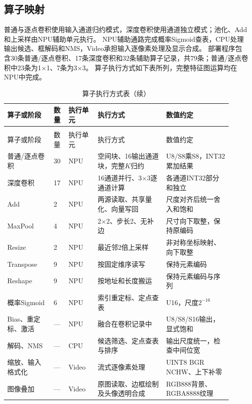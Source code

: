 \subsection{算子映射}

普通与逐点卷积使用输入通道归约模式，深度卷积使用通道独立模式；池化、Add和上采样由NPU辅助单元执行。
NPU辅助通路完成概率Sigmoid查表，CPU处理输出候选、框解码和NMS，Video承担输入逐像素处理及显示合成。
部署程序包含30条普通/逐点卷积、17条深度卷积和32条辅助算子记录，共79条；普通/逐点卷积中23条为1$\times$1、7条为3$\times$3。
算子执行方式如下表所列，完整特征图运算均在NPU中完成。

\begin{reporttable}
\setlength{\tabcolsep}{3pt}
\begin{longtable}{@{}p{0.19\linewidth}p{0.06\linewidth}p{0.12\linewidth}p{0.28\linewidth}p{0.27\linewidth}@{}}
\caption{算子执行方式表}\\
\toprule
算子或阶段 & 数量 & 执行单元 & 执行方式 & 数值约定 \\
\midrule
\endfirsthead
\caption[]{算子执行方式表（续）}\\
\toprule
算子或阶段 & 数量 & 执行单元 & 执行方式 & 数值约定 \\
\midrule
\endhead
\bottomrule
\endfoot
普通/逐点卷积 & 30 & NPU & 空间块、16输出通道块，完整$K$归约 & U8/S8乘S8，INT32累加结果 \\
深度卷积 & 17 & NPU & 16通道并行、3$\times$3逐通道计算 & 各通道INT32部分和独立 \\
Add & 2 & NPU & 两源读取、共享量化、向量写回 & 尺度对齐后统一舍入和饱和 \\
MaxPool & 4 & NPU & 2$\times$2、步长2、无补边 & 尺寸向下取整，保持原编码 \\
Resize & 2 & NPU & 最近邻2倍上采样 & 非对称坐标映射、向下取整 \\
Transpose & 9 & NPU & 按固定维序读写 & 保持元素编码 \\
Reshape & 9 & NPU & 按地址和长度搬运 & 保持元素编码与序列 \\
概率Sigmoid & 6 & NPU & 索引重定标、定点查表 & U16，尺度$2^{-16}$ \\
Bias、重定标、激活 & --- & NPU & 融合在卷积记录中 & U8/S8/S16输出，显式饱和 \\
解码、NMS & --- & CPU & 候选筛选、定点查表与排序 & 输出尺度统一，检查中间位宽 \\
缩放、输入格式化 & --- & Video & 流式逐像素处理 & UINT8 BGR NCHW、上下补零 \\
图像叠加 & --- & Video & 原图读取、边框绘制及头像透明合成 & RGB888背景、RGBA8888纹理 \\
\end{longtable}
\end{reporttable}

